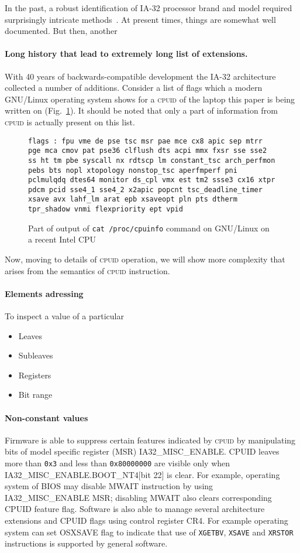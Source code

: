 \documentclass[a4paper,10pt,oneside,unicode]{article}
\newcommand{\cpuid}{\textsc{cpuid} }
\begin{document}
In the past, a robust identification of IA-32 processor brand and model required surprisingly intricate methods~\cite{cpuid-wars}. At present times, things are somewhat well documented. But then, another

\paragraph{Long history that lead to extremely long list of extensions.} With 40 years of backwards-compatible development the IA-32 architecture collected a number of additions. Consider a list of flags which a modern GNU/Linux operating system shows for a \cpuid of the laptop this paper is being written on (Fig.~\ref{fig:flags}). It should be noted that only a part of information from \cpuid is actually present on this list.

\begin{figure}
\noindent\texttt{flags           : fpu vme de pse tsc msr pae mce cx8 apic sep mtrr pge mca cmov pat pse36 clflush dts acpi mmx fxsr sse sse2 ss ht tm pbe syscall nx rdtscp lm constant\_tsc arch\_perfmon pebs bts nopl xtopology nonstop\_tsc aperfmperf pni pclmulqdq dtes64 monitor ds\_cpl vmx est tm2 ssse3 cx16 xtpr pdcm pcid sse4\_1 sse4\_2 x2apic popcnt tsc\_deadline\_timer xsave avx lahf\_lm arat epb xsaveopt pln pts dtherm tpr\_shadow vnmi flexpriority ept vpid
}
\caption{Part of output of \texttt{cat /proc/cpuinfo} command on GNU/Linux on a recent Intel {CPU}}\label{fig:flags}
\end{figure} 

Now, moving to details of \cpuid operation, we will show more complexity that arises from the semantics of \cpuid instruction.

\paragraph{Elements adressing}

To inspect a value of a particular
\begin{itemize}
\item Leaves
\item Subleaves
\item Registers
\item Bit range
\end{itemize}

\paragraph{Non-constant values} Firmware is able to suppress certain features indicated by \cpuid by manipulating bits of model specific register (MSR) IA32\_MISC\_ENABLE. CPUID leaves more than \texttt{0x3} and less than \texttt{0x80000000} are visible only when IA32\_MISC\_ENABLE.BOOT\_NT4[bit 22] is clear. For example, operating system of BIOS may disable MWAIT instruction by using IA32\_MISC\_ENABLE MSR; disabling MWAIT also clears corresponding CPUID feature flag. Software is also able to manage several architecture extensions and CPUID flags using control register CR4. For example operating system can set OSXSAVE flag to indicate that use of \texttt{XGETBV}, \texttt{XSAVE} and \texttt{XRSTOR} instructions is supported by general software.
\end{document}
